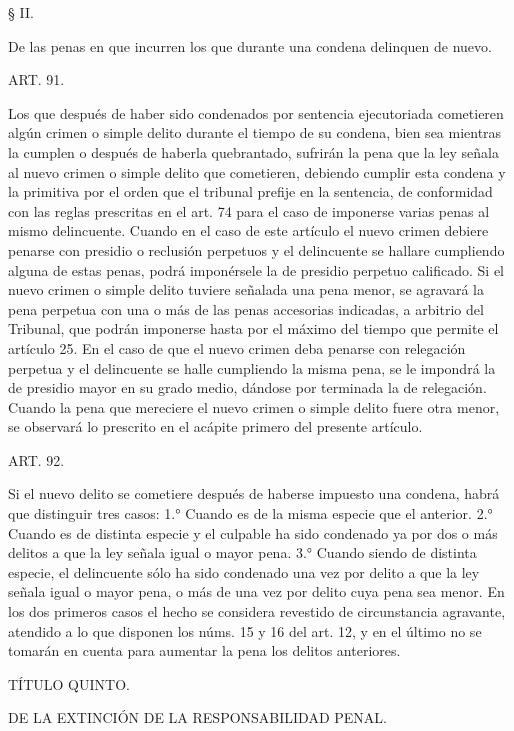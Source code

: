     § II.

De las penas en que incurren los que durante una condena delinquen de nuevo.


    ART. 91.

    Los que después de haber sido condenados por sentencia ejecutoriada cometieren algún crimen o simple delito durante el tiempo de su condena, bien sea mientras la cumplen o después de haberla quebrantado, sufrirán la pena que la ley señala al nuevo crimen o simple delito que cometieren, debiendo cumplir esta condena y la primitiva por el orden que el tribunal prefije en la sentencia, de conformidad con las reglas prescritas en el art. 74 para el caso de imponerse varias penas al mismo delincuente. 
    Cuando en el caso de este artículo el nuevo crimen debiere penarse con presidio o reclusión perpetuos y el delincuente se hallare cumpliendo alguna de estas penas, podrá imponérsele la de presidio perpetuo calificado. Si el nuevo crimen o simple delito tuviere señalada una pena menor, se agravará la pena perpetua con una o más de las penas accesorias indicadas, a arbitrio del Tribunal, que podrán imponerse hasta por el máximo del tiempo que permite el artículo 25.
    En el caso de que el nuevo crimen deba penarse con relegación perpetua y el delincuente se halle cumpliendo la misma pena, se le impondrá la de presidio mayor en su grado medio, dándose por terminada la de relegación.
    Cuando la pena que mereciere el nuevo crimen o simple delito fuere otra menor, se observará lo prescrito en el acápite primero del presente artículo.

    ART. 92.

    Si el nuevo delito se cometiere después de haberse impuesto una condena, habrá que distinguir tres casos:
    1.° Cuando es de la misma especie que el anterior.
    2.° Cuando es de distinta especie y el culpable ha sido condenado ya por dos o más delitos a que la ley señala igual o mayor pena.
    3.° Cuando siendo de distinta especie, el delincuente sólo ha sido condenado una vez por delito a que la ley señala igual o mayor pena, o más de una vez por delito cuya pena sea menor.
    En los dos primeros casos el hecho se considera revestido de circunstancia agravante, atendido a lo que disponen los núms. 15 y 16 del art. 12, y en el último no se tomarán en cuenta para aumentar la pena los delitos anteriores.





    TÍTULO QUINTO.

    DE LA EXTINCIÓN DE LA RESPONSABILIDAD PENAL.


